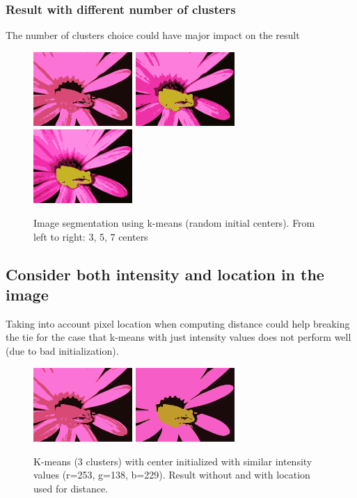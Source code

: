 \documentclass[a4paper, 10pt]{article}
\begin{document}
\subsubsection*{Result with different number of clusters}
The number of clusters choice could have major impact on the result
\begin{figure}[!htb]
\centering
\includegraphics[width=142px]{frog_rgb_3_out.png}
\includegraphics[width=142px]{frog_rgb_5_out.png}
\includegraphics[width=142px]{frog_rgb_7_out.png}
\caption[caption]{Image segmentation using k-means (random initial centers). From left to right: 3, 5, 7 centers}
\end{figure}

\subsection*{Consider both intensity and location in the image}
Taking into account pixel location when computing distance could help breaking the tie for the case that k-means with just intensity values does not perform well (due to bad initialization).
\begin{figure}[!htb]
\centering
\includegraphics[width=142px]{frog_rgb_3_out.png}
\includegraphics[width=142px]{frog_rgb_loc_3_out.png}
\caption[caption]{K-means (3 clusters) with center initialized with similar intensity values (r=253, g=138, b=229). Result without and with location used for distance.}
\end{figure}
\end{document}
